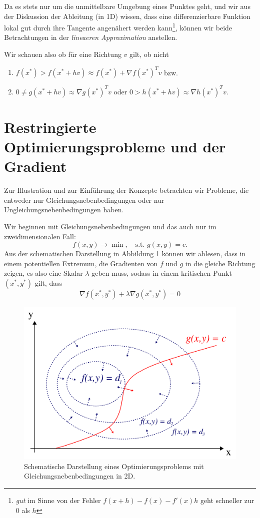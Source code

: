\documentclass[]{book}
\providecommand{\tightlist}{%
  \setlength{\itemsep}{0pt}\setlength{\parskip}{0pt}}
\theoremstyle{definition}
\theoremstyle{definition}
\theoremstyle{definition}
\theoremstyle{definition}
\theoremstyle{remark}
\begin{document}
Da es stets nur um die unmittelbare Umgebung eines Punktes geht, und wir aus der Diskussion der Ableitung (in 1D) wissen, dass eine differenzierbare Funktion lokal gut durch ihre Tangente angenähert werden kann\footnote{\emph{gut} im Sinne von der Fehler \(f(x+h)-f(x)-f'(x)h\) geht schneller zur \(0\) als \(h\)}, können wir beide Betrachtungen in der \emph{lineaeren Approximation} anstellen.

Wir schauen also ob für eine Richtung \(v\) gilt, ob nicht

\begin{enumerate}
\def\labelenumi{\arabic{enumi}.}
\tightlist
\item
  \(f(x^*) > f(x^*+hv) \approx f(x^*) + \nabla f(x^*)^Tv\) bzw.
\item
  \(0 \neq g(x^*+hv) \approx \nabla g(x^*)^Tv\) oder \(0>h(x^*+hv) \approx \nabla h(x^*)^Tv\).
\end{enumerate}

\hypertarget{restringierte-optimierungsprobleme-und-der-gradient}{%
\section{Restringierte Optimierungsprobleme und der Gradient}\label{restringierte-optimierungsprobleme-und-der-gradient}}

Zur Illustration und zur Einführung der Konzepte betrachten wir Probleme, die entweder nur Gleichungsnebenbedingungen oder nur Ungleichungsnebenbedingungen haben.

Wir beginnen mit Gleichungsnebenbedingungen und das auch nur im zweidimensionalen Fall:
\begin{equation*}
f(x,y) \to \min, \quad \text{s.t. }g(x,y)=c.
\end{equation*}
Aus der schematischen Darstellung in Abbildung \ref{fig:eqconstraint-opti} können wir ablesen, dass in einem potentiellen Extremum, die Gradienten von \(f\) und \(g\) in die gleiche Richtung zeigen, es also eine Skalar \(\lambda\) geben muss, sodass in einem kritischen Punkt \((x^*, y^*)\) gilt, dass
\begin{equation*}
\nabla f(x^*, y^*) + \lambda \nabla g(x^*, y^*) =0
\end{equation*}

\begin{figure}

{\centering \includegraphics[width=0.6\linewidth]{bilder/08-LagrangeMultipliers2D} 

}

\caption{Schematische Darstellung eines Optimierungsproblems mit Gleichungsnebenbedingungen in 2D.}\label{fig:eqconstraint-opti}
\end{figure}
\end{document}
